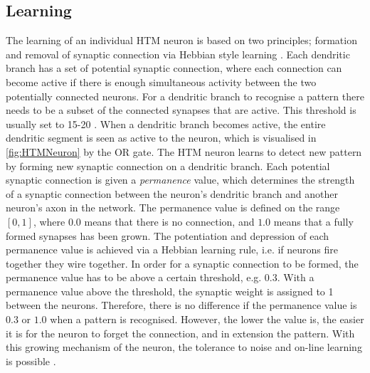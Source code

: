 \subsection{Learning}
The learning of an individual HTM neuron is based on two principles; formation and removal of synaptic connection via Hebbian style learning \cite{10.3389/fncir.2016.00023}. Each dendritic branch has a set of potential synaptic connection, where each connection can become active if there is enough simultaneous activity between the two potentially connected neurons. For a dendritic branch to recognise a pattern there needs to be a subset of the connected synapses that are active. This threshold is usually set to 15-20 \cite{10.3389/fncir.2016.00023}. When a dendritic branch becomes active, the entire dendritic segment is seen as active to the neuron, which is visualised in \autoref{fig:HTMNeuron} by the OR gate. The HTM neuron learns to detect new pattern by forming new synaptic connection on a dendritic branch. Each potential synaptic connection is given a \textit{permanence} value, which determines the strength of a synaptic connection between the neuron's dendritic branch and another neuron's axon in the network. The permanence value is defined on the range $[0, 1]$, where $0.0$ means that there is no connection, and $1.0$ means that a fully formed synapses has been grown. The potentiation and depression of each permanence value is achieved via a Hebbian learning rule, i.e. if neurons fire together they wire together. In order for a synaptic connection to be formed, the permanence value has to be above a certain threshold, e.g. $0.3$. With a permanence value above the threshold, the synaptic weight is assigned to 1 between the neurons. Therefore, there is no difference if the permanence value is $0.3$ or $1.0$ when a pattern is recognised. However, the lower the value is, the easier it is for the neuron to forget the connection, and in extension the pattern. With this growing mechanism of the neuron, the tolerance to noise and on-line learning is possible \cite{10.3389/fncir.2016.00023}. 


